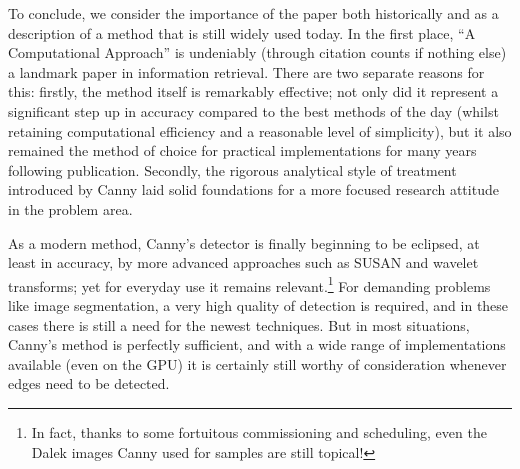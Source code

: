 \documentclass{acm_proc_article-sp}
\begin{document}
To conclude, we consider the importance of the paper both historically and as a
description of a method that is still widely used today. In the first place,
``A Computational Approach'' is undeniably (through citation counts if nothing
else) a landmark paper in information retrieval. There are two separate reasons
for this: firstly, the method itself is remarkably effective; not only did it
represent a significant step up in accuracy compared to the best methods of the
day (whilst retaining computational efficiency and a reasonable level of
simplicity), but it also remained the method of choice for practical
implementations for many years following publication. Secondly, the rigorous
analytical style of treatment introduced by Canny laid solid foundations for a
more focused research attitude in the problem area.

As a modern method, Canny's detector is finally beginning to be eclipsed, at
least in accuracy, by more advanced approaches such as SUSAN and wavelet
transforms; yet for everyday use it remains relevant.\footnote{In fact, thanks
to some fortuitous commissioning and scheduling,
 even the Dalek images Canny used for samples are still topical!} For demanding
 problems like image segmentation, a very high quality of detection is
 required, and in these cases there is still a need for the newest techniques.
 But in most situations, Canny's method is perfectly sufficient, and with a
 wide range of implementations available (even on the
 GPU\cite{10.1109/CVPRW.2008.4563088}) it is certainly still worthy of
 consideration whenever edges need to be detected.
 


{}



\balancecolumns
\end{document}
